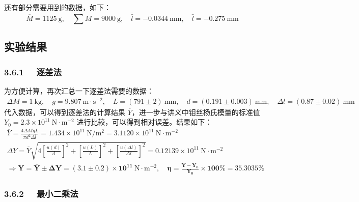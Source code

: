 \documentclass[UTF8]{article}
\theoremstyle{MyLineTheoremStyle} %
\theoremstyle{MyBlockTheoremStyle} %
\theoremstyle{MySubsubsectionStyle} %
\begin{document}
还有部分需要用到的数据，如下：
\begin{equation}
    \overline{M} = 1125 \ \mathrm{g},\quad \sum M = 9000 \ \mathrm{g} ,\quad \bar{\bar{l}} = -0.0344 \ \mathrm{mm},\quad \bar{l} = -0.275 \ \mathrm{mm}
\end{equation}


\subsection{实验结果}

\subsubsection*{3.6.1 \ \ 逐差法}

为方便计算，再次汇总一下逐差法需要的数据：
\begin{gather*}
\Delta M = 1\ \mathrm{kg},\quad g = 9.807 \ \mathrm{m\cdot s^{-2}},\quad L = (791 \pm 2) \ \mathrm{mm},\quad d = (0.191 \pm 0.003) \ \mathrm{mm},\quad \Delta l = (0.87 \pm 0.02 ) \ \mathrm{mm}
\end{gather*}
代入数据，可以得到逐差法的计算结果 $\overline{Y}$，进一步与讲义中钼丝杨氏模量的标准值 $Y_0 = 2.3 \times 10^{11} \ \mathrm{N\cdot m^{-2}}$ 进行比较，可以得到相对误差。结果如下：
\begin{gather}
    \overline{Y} =\frac{4\Delta MgL}{\pi d^{2}\Delta\bar{l}}=1.434\times10^{11}\ \mathrm{N/m^{2}} = 3.1120 \times 10^{11} \ \mathrm{N\cdot m^{-2}} \\
    \Delta Y = \overline{Y}\sqrt{ 4 \left[ \frac{u(d)}{d} \right]^2 + \left[ \frac{u(L)}{L} \right]^2 + \left[ \frac{u(\Delta l)}{\Delta l} \right]^2 } = 0.12139 \times 10^{11}  \ \mathrm{N\cdot m^{-2}}\\
    \Longrightarrow  \boldsymbol{
        Y = \overline{Y} \pm \Delta Y = (3.1 \pm 0.2) \times 10^{11} \ \mathrm{N\cdot m^{-2}}
        ,\quad
        \eta = \frac{Y - Y_0}{Y_0} \times 100\% = 35.3035\% 
    }
\end{gather}


\subsubsection*{3.6.2 \ \ 最小二乘法}
\end{document}
